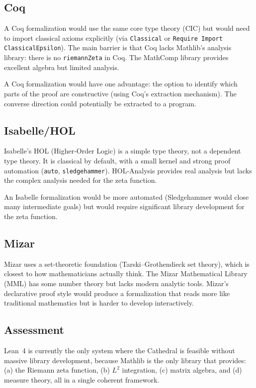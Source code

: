 \documentclass[11pt,a4paper]{article}
\theoremstyle{plain}
\theoremstyle{definition}
\newcommand{\lean}[1]{\texttt{#1}}
\begin{document}
\subsection{Coq}

A Coq formalization would use the same core type theory (CIC) but
would need to import classical axioms explicitly (via
\lean{Classical} or \lean{Require Import ClassicalEpsilon}). The
main barrier is that Coq lacks Mathlib's analysis library: there is
no \lean{riemannZeta} in Coq. The MathComp library provides excellent
algebra but limited analysis.

A Coq formalization would have one advantage: the option to identify
which parts of the proof are constructive (using Coq's extraction
mechanism). The converse direction could potentially be extracted
to a program.

\subsection{Isabelle/HOL}

Isabelle's HOL (Higher-Order Logic) is a simple type theory, not a
dependent type theory. It is classical by default, with a small
kernel and strong proof automation (\lean{auto}, \lean{sledgehammer}).
HOL-Analysis provides real analysis but lacks the complex analysis
needed for the zeta function.

An Isabelle formalization would be more automated (Sledgehammer would
close many intermediate goals) but would require significant library
development for the zeta function.

\subsection{Mizar}

Mizar uses a set-theoretic foundation (Tarski--Grothendieck set theory),
which is closest to how mathematicians actually think. The Mizar
Mathematical Library (MML) has some number theory but lacks modern
analytic tools. Mizar's declarative proof style would produce a
formalization that reads more like traditional mathematics but is
harder to develop interactively.

\subsection{Assessment}

Lean~4 is currently the only system where the Cathedral is feasible
without massive library development, because Mathlib is the only
library that provides: (a) the Riemann zeta function, (b) $L^2$
integration, (c) matrix algebra, and (d) measure theory, all in a
single coherent framework.
\end{document}
